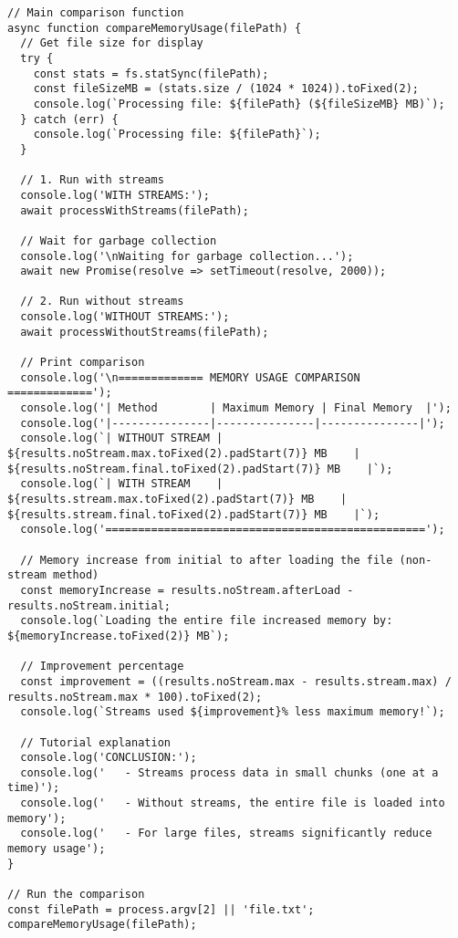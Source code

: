 \documentclass[12pt,letterpaper]{article}
\newenvironment{macterminal}{%
    \begin{mdframed}[
        linecolor=terminalFrame,
        backgroundcolor=terminalBg,
        roundcorner=5pt,
        skipabove=5pt,
        skipbelow=5pt,
        linewidth=1pt,
        innertopmargin=5pt,
        frametitle={%
            \tikz[baseline=(current bounding box.east), outer sep=0pt]{
                \fill[red!80!black] (0,0) circle (5pt);
                \fill[yellow!80!black] (0.7,0) circle (5pt);
                \fill[green!70!black] (1.4,0) circle (5pt);
            }
        },
        frametitlealignment=\raggedright,
        frametitleaboveskip=8pt,
        frametitlebelowskip=0pt,
    ]
}{%
    \end{mdframed}%
}
\begin{document}
\begin{macterminal}
\begin{lstlisting}
// Main comparison function
async function compareMemoryUsage(filePath) {
  // Get file size for display
  try {
    const stats = fs.statSync(filePath);
    const fileSizeMB = (stats.size / (1024 * 1024)).toFixed(2);
    console.log(`Processing file: ${filePath} (${fileSizeMB} MB)`);
  } catch (err) {
    console.log(`Processing file: ${filePath}`);
  }
  
  // 1. Run with streams
  console.log('WITH STREAMS:');
  await processWithStreams(filePath);
  
  // Wait for garbage collection
  console.log('\nWaiting for garbage collection...');
  await new Promise(resolve => setTimeout(resolve, 2000));
  
  // 2. Run without streams
  console.log('WITHOUT STREAMS:');
  await processWithoutStreams(filePath);
  
  // Print comparison
  console.log('\n============= MEMORY USAGE COMPARISON =============');
  console.log('| Method        | Maximum Memory | Final Memory  |');
  console.log('|---------------|---------------|---------------|');
  console.log(`| WITHOUT STREAM | ${results.noStream.max.toFixed(2).padStart(7)} MB    | ${results.noStream.final.toFixed(2).padStart(7)} MB    |`);
  console.log(`| WITH STREAM    | ${results.stream.max.toFixed(2).padStart(7)} MB    | ${results.stream.final.toFixed(2).padStart(7)} MB    |`);
  console.log('=================================================');
  
  // Memory increase from initial to after loading the file (non-stream method)
  const memoryIncrease = results.noStream.afterLoad - results.noStream.initial;
  console.log(`Loading the entire file increased memory by: ${memoryIncrease.toFixed(2)} MB`);
  
  // Improvement percentage
  const improvement = ((results.noStream.max - results.stream.max) / results.noStream.max * 100).toFixed(2);
  console.log(`Streams used ${improvement}% less maximum memory!`);
  
  // Tutorial explanation
  console.log('CONCLUSION:');
  console.log('   - Streams process data in small chunks (one at a time)');
  console.log('   - Without streams, the entire file is loaded into memory');
  console.log('   - For large files, streams significantly reduce memory usage');
}

// Run the comparison
const filePath = process.argv[2] || 'file.txt';
compareMemoryUsage(filePath);
\end{lstlisting}
\end{macterminal}
\end{document}
